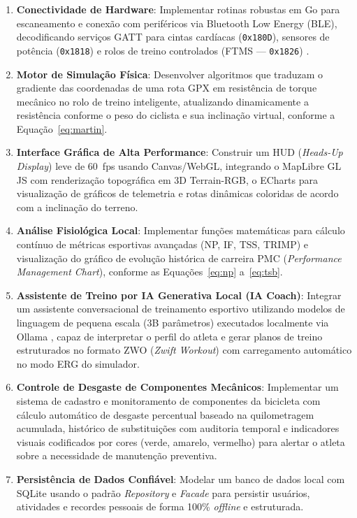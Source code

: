 \documentclass[
    a4paper,
    12pt,
    oneside,
    english,
    brazil,
    chapter=TITLE,
    section=TITLE,
]{abntex2}
\begin{document}
\begin{enumerate}
    \item \textbf{Conectividade de Hardware}: Implementar rotinas robustas em Go para escaneamento e conexão com periféricos via Bluetooth Low Energy (BLE), decodificando serviços GATT para cintas cardíacas (\texttt{0x180D}), sensores de potência (\texttt{0x1818}) e rolos de treino controlados (FTMS --- \texttt{0x1826}) \cite{bluetooth2017}.
    \item \textbf{Motor de Simulação Física}: Desenvolver algoritmos que traduzam o gradiente das coordenadas de uma rota GPX \cite{gpx2004} em resistência de torque mecânico no rolo de treino inteligente, atualizando dinamicamente a resistência conforme o peso do ciclista e sua inclinação virtual, conforme a Equação~\ref{eq:martin}.
    \item \textbf{Interface Gráfica de Alta Performance}: Construir um HUD (\textit{Heads-Up Display}) leve de 60~fps usando Canvas/WebGL, integrando o MapLibre GL JS \cite{maplibre2024} com renderização topográfica em 3D Terrain-RGB, o ECharts \cite{echarts2024} para visualização de gráficos de telemetria e rotas dinâmicas coloridas de acordo com a inclinação do terreno.
    \item \textbf{Análise Fisiológica Local}: Implementar funções matemáticas para cálculo contínuo de métricas esportivas avançadas (NP, IF, TSS, TRIMP) e visualização do gráfico de evolução histórica de carreira PMC (\textit{Performance Management Chart}), conforme as Equações~\ref{eq:np} a~\ref{eq:tsb}.
    \item \textbf{Assistente de Treino por IA Generativa Local (IA Coach)}: Integrar um assistente conversacional de treinamento esportivo utilizando modelos de linguagem de pequena escala (3B parâmetros) executados localmente via Ollama \cite{ollama2024}, capaz de interpretar o perfil do atleta e gerar planos de treino estruturados no formato ZWO (\textit{Zwift Workout}) com carregamento automático no modo ERG do simulador.
    \item \textbf{Controle de Desgaste de Componentes Mecânicos}: Implementar um sistema de cadastro e monitoramento de componentes da bicicleta com cálculo automático de desgaste percentual baseado na quilometragem acumulada, histórico de substituições com auditoria temporal e indicadores visuais codificados por cores (verde, amarelo, vermelho) para alertar o atleta sobre a necessidade de manutenção preventiva.
    \item \textbf{Persistência de Dados Confiável}: Modelar um banco de dados local com SQLite \cite{sqlite2024} usando o padrão \textit{Repository} e \textit{Facade} para persistir usuários, atividades e recordes pessoais de forma 100\% \textit{offline} e estruturada.

\end{enumerate}
\end{document}
